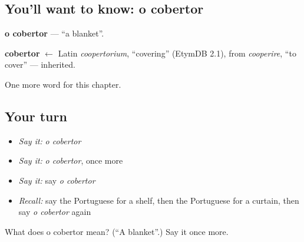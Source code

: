 \subsection*{You'll want to know: o cobertor}
\textbf{o cobertor} — \textquotedblleft{}a blanket\textquotedblright{}.

\begin{cousinweb}
\textbf{cobertor} $\leftarrow$ Latin \emph{coopertorium}, \textquotedblleft{}covering\textquotedblright{} (EtymDB 2.1), from \emph{cooperire}, \textquotedblleft{}to cover\textquotedblright{} — inherited.
\end{cousinweb}

\begin{grammarlens}[title={What you've built}]
One more word for this chapter.
\end{grammarlens}

\subsection*{Your turn}
\begin{itemize}
\raggedright
  \item \emph{Say it:} \emph{o cobertor}
  \item \emph{Say it:} \emph{o cobertor}, once more
  \item \emph{Say it:} say \emph{o cobertor}
  \item \emph{Recall:} say the Portuguese for a shelf, then the Portuguese for a curtain, then say \emph{o cobertor} again
\end{itemize}

\begin{tcolorbox}[breakable,colback=teal!4,colframe=teal!35!black,title={Before you move on}]
What does o cobertor mean? (\textquotedblleft{}A blanket\textquotedblright{}.) Say it once more.
\end{tcolorbox}
